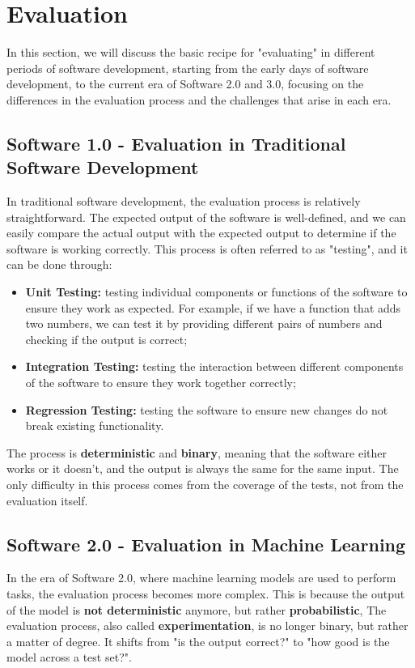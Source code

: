 \section{Evaluation}
In this section, we will discuss the basic recipe for "evaluating" in different periods of software development,
starting from the early days of software development, to the current era of Software 2.0 and 3.0, focusing on the differences 
in the evaluation process and the challenges that arise in each era.

\subsection{Software 1.0 - Evaluation in Traditional Software Development}
In traditional software development, the evaluation process is relatively straightforward.
The expected output of the software is well-defined, and we can easily compare the actual output with the expected output to determine if the software is working correctly.
This process is often referred to as "testing", and it can be done through:
\begin{itemize}
    \item \textbf{Unit Testing:} testing individual components or functions of the software to ensure they work as expected.
    For example, if we have a function that adds two numbers, we can test it by providing different pairs of numbers and checking if the output is correct;
    \item \textbf{Integration Testing:} testing the interaction between different components of the software to ensure they work together correctly;
    \item \textbf{Regression Testing:} testing the software to ensure new changes do not break existing functionality.
\end{itemize}
The process is \textbf{deterministic} and \textbf{binary}, meaning that the software either works or it doesn't, and the output is always the same for the same input.
The only difficulty in this process comes from the coverage of the tests, not from the evaluation itself.

\subsection{Software 2.0 - Evaluation in Machine Learning}
In the era of Software 2.0, where machine learning models are used to perform tasks, the evaluation process becomes more complex.
This is because the output of the model is \textbf{not deterministic} anymore, but rather \textbf{probabilistic}, 
The evaluation process, also called \textbf{experimentation}, is no longer binary, but rather a matter of degree. It shifts from "is the output correct?" to "how good is the model across a test set?".


